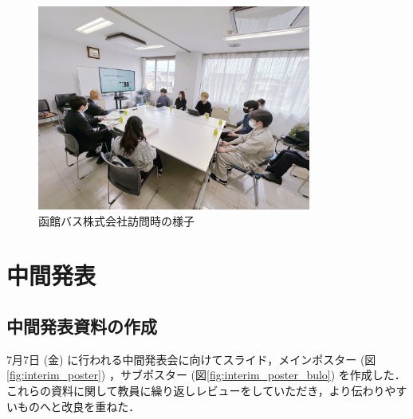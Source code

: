 \begin{figure}[H]
    \centering
    \includegraphics[width=9cm]{images/hakodate_bus.png}
    \caption{函館バス株式会社訪問時の様子}
    \label{fig:hakodate_bus}
\end{figure}

\section{中間発表}
\subsection{中間発表資料の作成}
7月7日 (金) に行われる中間発表会に向けてスライド，メインポスター (図\ref{fig:interim_poster}) ，サブポスター (図\ref{fig:interim_poster_bulo}) を作成した．これらの資料に関して教員に繰り返しレビューをしていただき，より伝わりやすいものへと改良を重ねた．

